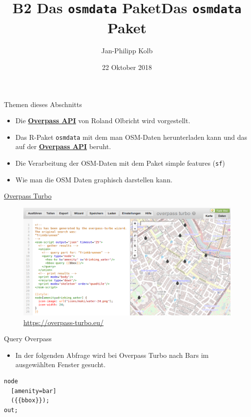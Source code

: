 \documentclass[ignorenonframetext,]{beamer}
\title{B2 Das \texttt{osmdata} Paket}
\title{Das \texttt{osmdata} Paket}
\author{Jan-Philipp Kolb}
\date{22 Oktober 2018}
\providecommand{\tightlist}{%
  \setlength{\itemsep}{0pt}\setlength{\parskip}{0pt}}
\begin{document}
\frame{\titlepage}

\begin{frame}[fragile]{Themen dieses Abschnitts}
\protect\hypertarget{themen-dieses-abschnitts}{}

\begin{itemize}
\tightlist
\item
  Die
  \href{https://wiki.openstreetmap.org/wiki/Overpass_API}{\textbf{Overpass
  API}} von Roland Olbricht wird vorgestellt.
\end{itemize}

\begin{itemize}
\item
  Das R-Paket \texttt{osmdata} mit dem man OSM-Daten herunterladen kann
  und das auf der
  \href{https://wiki.openstreetmap.org/wiki/Overpass_API}{\textbf{Overpass
  API}} beruht.
\item
  Die Verarbeitung der OSM-Daten mit dem Paket simple features
  (\texttt{sf})
\item
  Wie man die OSM Daten graphisch darstellen kann.
\end{itemize}

\end{frame}

\begin{frame}{\href{https://overpass-turbo.eu/}{Overpass Turbo}}
\protect\hypertarget{overpass-turbo}{}

\begin{figure}
\centering
\includegraphics{figure/Overpass_turbo_query_wizard_result_DE.png}
\caption{\url{https://overpass-turbo.eu/}}
\end{figure}

\end{frame}

\begin{frame}[fragile]{Query Overpass}
\protect\hypertarget{query-overpass}{}

\begin{itemize}
\tightlist
\item
  In der folgenden Abfrage wird bei Overpass Turbo nach Bars im
  ausgewählten Fenster gesucht.
\end{itemize}

\begin{verbatim}
node
  [amenity=bar]
  ({{bbox}});
out;
\end{verbatim}

\end{frame}
\end{document}
